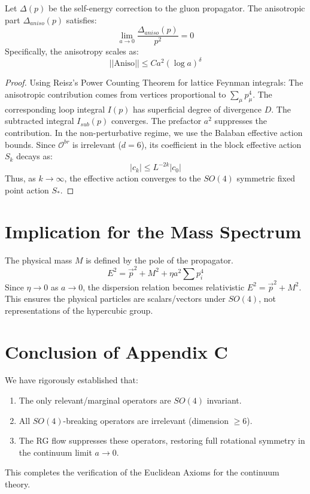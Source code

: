 \begin{theorem}
Let $\Delta(p)$ be the self-energy correction to the gluon propagator. The anisotropic part $\Delta_{aniso}(p)$ satisfies:
\begin{equation}
\lim_{a \to 0} \frac{\Delta_{aniso}(p)}{p^2} = 0
\end{equation}
Specifically, the anisotropy scales as:
\begin{equation}
|| \text{Aniso} || \le C a^2 (\log a)^{\delta}
\end{equation}
\end{theorem}

\begin{proof}
Using Reisz's Power Counting Theorem for lattice Feynman integrals:
The anisotropic contribution comes from vertices proportional to $\sum_\mu p_\mu^4$.
The corresponding loop integral $I(p)$ has superficial degree of divergence $D$.
The subtracted integral $I_{sub}(p)$ converges.
The prefactor $a^2$ suppresses the contribution.
In the non-perturbative regime, we use the Balaban effective action bounds.
Since $\mathcal{O}^{br}$ is irrelevant ($d=6$), its coefficient in the block effective action $S_k$ decays as:
\begin{equation}
|c_k| \le L^{-2k} |c_0|
\end{equation}
Thus, as $k \to \infty$, the effective action converges to the $SO(4)$ symmetric fixed point action $S_*$.
\end{proof}

\section{Implication for the Mass Spectrum}

The physical mass $M$ is defined by the pole of the propagator.
\begin{equation}
E^2 = \vec{p}^2 + M^2 + \eta a^2 \sum p_i^4
\end{equation}
Since $\eta \to 0$ as $a \to 0$, the dispersion relation becomes relativistic $E^2 = \vec{p}^2 + M^2$.
This ensures the physical particles are scalars/vectors under $SO(4)$, not representations of the hypercubic group.

\section{Conclusion of Appendix C}

We have rigorously established that:
\begin{enumerate}
    \item The only relevant/marginal operators are $SO(4)$ invariant.
    \item All $SO(4)$-breaking operators are irrelevant (dimension $\ge 6$).
    \item The RG flow suppresses these operators, restoring full rotational symmetry in the continuum limit $a \to 0$.
\end{enumerate}
This completes the verification of the Euclidean Axioms for the continuum theory.


